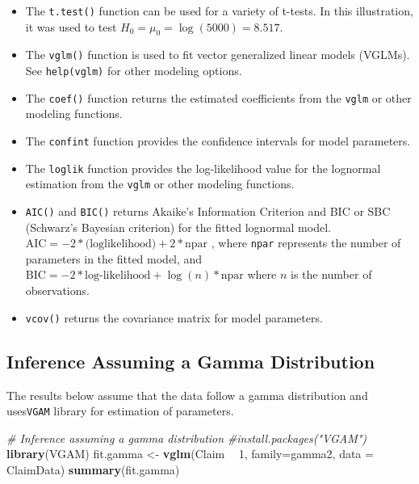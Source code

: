 \documentclass[]{book}
\newenvironment{Shaded}{\begin{snugshade}}{\end{snugshade}}
\newcommand{\KeywordTok}[1]{\textcolor[rgb]{0.13,0.29,0.53}{\textbf{#1}}}
\newcommand{\DataTypeTok}[1]{\textcolor[rgb]{0.13,0.29,0.53}{#1}}
\newcommand{\DecValTok}[1]{\textcolor[rgb]{0.00,0.00,0.81}{#1}}
\newcommand{\StringTok}[1]{\textcolor[rgb]{0.31,0.60,0.02}{#1}}
\newcommand{\CommentTok}[1]{\textcolor[rgb]{0.56,0.35,0.01}{\textit{#1}}}
\newcommand{\OperatorTok}[1]{\textcolor[rgb]{0.81,0.36,0.00}{\textbf{#1}}}
\newcommand{\NormalTok}[1]{#1}
\providecommand{\tightlist}{%
  \setlength{\itemsep}{0pt}\setlength{\parskip}{0pt}}
\theoremstyle{definition}
\theoremstyle{definition}
\theoremstyle{definition}
\theoremstyle{remark}
\begin{document}
\begin{itemize}
\tightlist
\item
  The \texttt{t.test()} function can be used for a variety of t-tests.
  In this illustration, it was used to test
  \(H_0=\mu_0=\log(5000)=8.517\).
\item
  The \texttt{vglm()} function is used to fit vector generalized linear
  models (VGLMs). See \texttt{help(vglm)} for other modeling options.
\item
  The \texttt{coef()} function returns the estimated coefficients from
  the \texttt{vglm} or other modeling functions.
\item
  The \texttt{confint} function provides the confidence intervals for
  model parameters.
\item
  The \texttt{loglik} function provides the log-likelihood value for the
  lognormal estimation from the \texttt{vglm} or other modeling
  functions.
\item
  \texttt{AIC()} and \texttt{BIC()} returns Akaike's Information
  Criterion and BIC or SBC (Schwarz's Bayesian criterion) for the fitted
  lognormal model.
  \(\text{AIC} =-2* \text{(loglikelihood)} + 2*\text{npar}\) , where
  \texttt{npar} represents the number of parameters in the fitted model,
  and \(\text{BIC} =-2* \text{log-likelihood} + \log(n)* \text{npar}\)
  where \(n\) is the number of observations.
\item
  \texttt{vcov()} returns the covariance matrix for model parameters.
\end{itemize}

\subsection{Inference Assuming a Gamma
Distribution}\label{inference-assuming-a-gamma-distribution}

The results below assume that the data follow a gamma distribution and
uses\texttt{VGAM} library for estimation of parameters.

\begin{Shaded}
\begin{Highlighting}[]
\CommentTok{#  Inference assuming a gamma distribution}
\CommentTok{#install.packages("VGAM")}
\KeywordTok{library}\NormalTok{(VGAM)}
\NormalTok{fit.gamma <-}\StringTok{ }\KeywordTok{vglm}\NormalTok{(Claim }\OperatorTok{~}\StringTok{ }\DecValTok{1}\NormalTok{, }\DataTypeTok{family=}\NormalTok{gamma2, }\DataTypeTok{data =}\NormalTok{ ClaimData)}
\KeywordTok{summary}\NormalTok{(fit.gamma)}
\end{Highlighting}
\end{Shaded}
\end{document}

